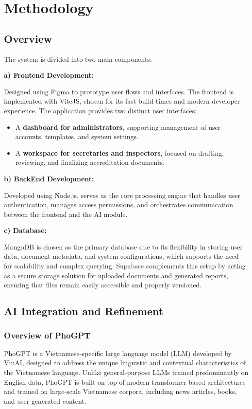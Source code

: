 \chapter{Methodology}

\section{Overview}

The system is divided into two main components:

\textbf{a) Frontend Development:}

Designed using Figma to prototype user flows and interfaces. The frontend is implemented with ViteJS, chosen for its fast build times and modern developer experience. The application provides two distinct user interfaces:
\begin{itemize}
    \item A \textbf{dashboard for administrators}, supporting management of user accounts, templates, and system settings.
    \item A \textbf{workspace for secretaries and inspectors}, focused on drafting, reviewing, and finalizing accreditation documents.
\end{itemize}

\textbf{b) BackEnd Development:} 

Developed using Node.js, serves as the core processing engine that handles user authentication, manages access permissions, and orchestrates communication between the frontend and the AI module. 

\textbf{c) Database:}

MongoDB is chosen as the primary database due to its flexibility in storing user data, document metadata, and system configurations, which supports the need for scalability and complex querying. Supabase complements this setup by acting as a secure storage solution for uploaded documents and generated reports, ensuring that files remain easily accessible and properly versioned.
\section{AI Integration and Refinement}
\subsection{Overview of PhoGPT}
PhoGPT\cite{phogpt} is a Vietnamese-specific large language model (LLM) developed by VinAI, designed to address the unique linguistic and contextual characteristics of the Vietnamese language. Unlike general-purpose LLMs trained predominantly on English data, PhoGPT is built on top of modern transformer-based architectures and trained on large-scale Vietnamese corpora, including news articles, books, and user-generated content.

